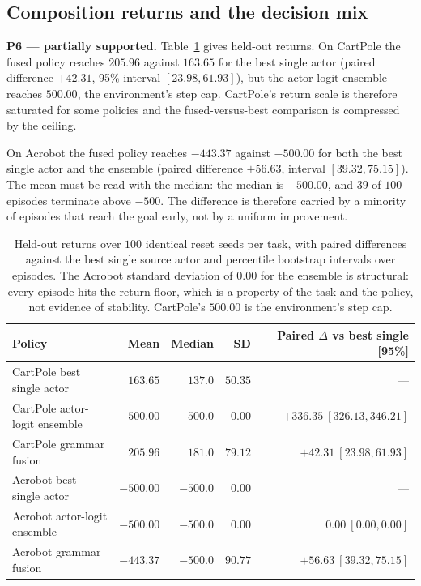 \documentclass[11pt,a4paper]{article}
\begin{document}
\subsection{Composition returns and the decision mix}
\label{sec:res-returns}

\textbf{P6 --- partially supported.} Table~\ref{tab:returns} gives held-out returns. On CartPole the fused policy reaches $205.96$ against $163.65$ for the best single actor (paired difference $+42.31$, 95\% interval $[23.98, 61.93]$), but the actor-logit ensemble reaches $500.00$, the environment's step cap. CartPole's return scale is therefore saturated for some policies and the fused-versus-best comparison is compressed by the ceiling.

On Acrobot the fused policy reaches $-443.37$ against $-500.00$ for both the best single actor and the ensemble (paired difference $+56.63$, interval $[39.32, 75.15]$). The mean must be read with the median: the median is $-500.00$, and $39$ of $100$ episodes terminate above $-500$. The difference is therefore carried by a minority of episodes that reach the goal early, not by a uniform improvement.

\begin{table}[H]
\centering
\caption{Held-out returns over $100$ identical reset seeds per task, with paired differences against the best single source actor and percentile bootstrap intervals over episodes. The Acrobot standard deviation of $0.00$ for the ensemble is structural: every episode hits the return floor, which is a property of the task and the policy, not evidence of stability. CartPole's $500.00$ is the environment's step cap.}
\label{tab:returns}
\small
\begin{tabular}{@{}lrrrr@{}}
\toprule
\textbf{Policy} & \textbf{Mean} & \textbf{Median} & \textbf{SD} & \textbf{Paired $\Delta$ vs best single [95\%]} \\
\midrule
CartPole best single actor & $163.65$ & $137.0$ & $50.35$ & --- \\
CartPole actor-logit ensemble & $500.00$ & $500.0$ & $0.00$ & $+336.35\ [326.13,346.21]$ \\
CartPole grammar fusion & $205.96$ & $181.0$ & $79.12$ & $+42.31\ [23.98,61.93]$ \\
\midrule
Acrobot best single actor & $-500.00$ & $-500.0$ & $0.00$ & --- \\
Acrobot actor-logit ensemble & $-500.00$ & $-500.0$ & $0.00$ & $0.00\ [0.00,0.00]$ \\
Acrobot grammar fusion & $-443.37$ & $-500.0$ & $90.77$ & $+56.63\ [39.32,75.15]$ \\
\bottomrule
\end{tabular}
\end{table}
\end{document}
